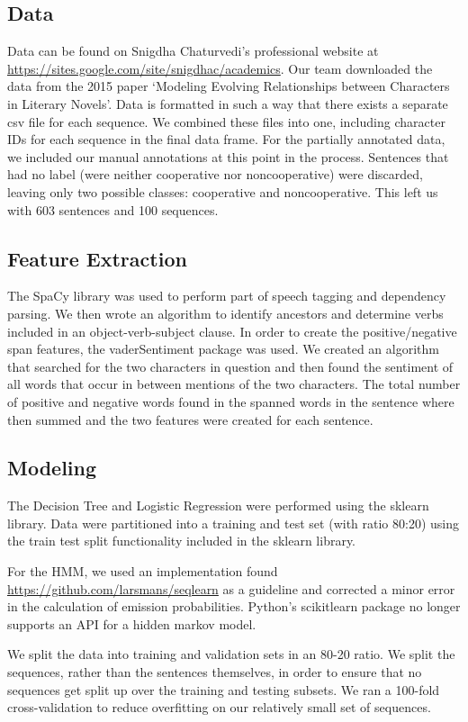 \documentclass[11pt,a4paper]{article}
\begin{document}
\subsection{Data}
Data can be found on Snigdha Chaturvedi’s professional website at \underline{https://sites.google.com/site/snigdhac/academics}. Our team downloaded the data from the 2015 paper ‘Modeling Evolving Relationships between Characters in Literary Novels’. Data is formatted in such a way that there exists a separate csv file for each sequence. We combined these files into one, including character IDs for each sequence in the final data frame. For the partially annotated data, we included our manual annotations at this point in the process. Sentences that had no label (were neither cooperative nor noncooperative) were discarded, leaving only two possible classes: cooperative and noncooperative. This left us with 603 sentences and 100 sequences. 

\subsection{Feature Extraction}
The SpaCy library was used to perform part of speech tagging and dependency parsing. We then wrote an algorithm to identify ancestors and determine verbs included in an object-verb-subject clause. 
In order to create the positive/negative span features, the vaderSentiment package was used. We created an algorithm that searched for the two characters in question and then found the sentiment of all words that occur in between mentions of the two characters. The total number of positive and negative words found in the spanned words in the sentence where then summed and the two features were created for each sentence.

\subsection{Modeling}
The Decision Tree and Logistic Regression were performed using the sklearn library. Data were partitioned into a training and test set (with ratio 80:20) using the train test split functionality included in the sklearn library. 

For the HMM, we used an implementation found \underline{https://github.com/larsmans/seqlearn} as a guideline and corrected a minor error in the calculation of emission probabilities. Python's scikitlearn package no longer supports an API for a hidden markov model. 

We split the data into training and validation sets in an 80-20 ratio. We split the sequences, rather than the sentences themselves, in order to ensure that no sequences get split up over the training and testing subsets. We ran a 100-fold cross-validation to reduce overfitting on our relatively small set of sequences.
\end{document}
